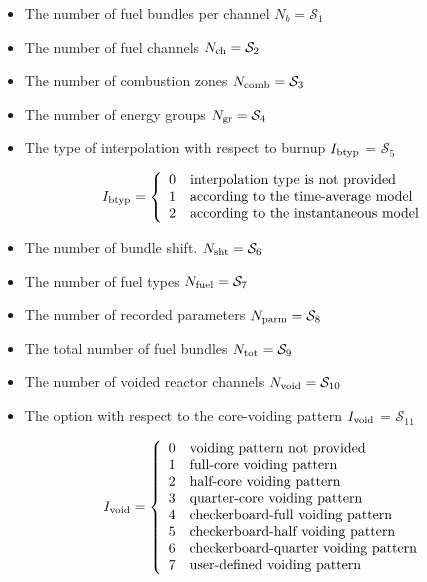 \begin{itemize}

\item The number of fuel bundles per channel $N_b = \mathcal{S}_1$

\item The number of fuel channels $N_{\rm ch} = \mathcal{S}_2$

\item The number of combustion zones $N_{\rm comb} = \mathcal{S}_3$

\item The number of energy groups $N_{\rm gr} = \mathcal{S}_4$

\item The type of interpolation with respect to burnup $I_{\rm btyp}$ = $\mathcal{S}_5$

\begin{displaymath} I_{\rm btyp} = \left\{
\begin{array}{rl}
 0 & \textrm{interpolation type is not provided} \\
 1 & \textrm{according to the time-average model} \\
 2 & \textrm{according to the instantaneous model} \\
\end{array} \right.
\end{displaymath}

\item The number of bundle shift. $N_{\rm sht} = \mathcal{S}_{6}$

\item The number of fuel types $N_{\rm fuel} = \mathcal{S}_7$

\item The number of recorded parameters $N_{\rm parm} = \mathcal{S}_8$

\item The total number of fuel bundles $N_{\rm tot} = \mathcal{S}_9$

\item The number of voided reactor channels $N_{\rm void} = \mathcal{S}_{10}$

\item The option with respect to the core-voiding pattern $I_{\rm void}$ = $\mathcal{S}_{11}$

\begin{displaymath} I_{\rm void} = \left\{
\begin{array}{rl}
 0 & \textrm{voiding pattern not provided} \\
 1 & \textrm{full-core voiding pattern} \\
 2 & \textrm{half-core voiding pattern} \\
 3 & \textrm{quarter-core voiding pattern} \\
 4 & \textrm{checkerboard-full voiding pattern} \\
 5 & \textrm{checkerboard-half voiding pattern} \\
 6 & \textrm{checkerboard-quarter voiding pattern} \\
 7 & \textrm{user-defined voiding pattern} \\
\end{array} \right.
\end{displaymath}


\end{itemize}
